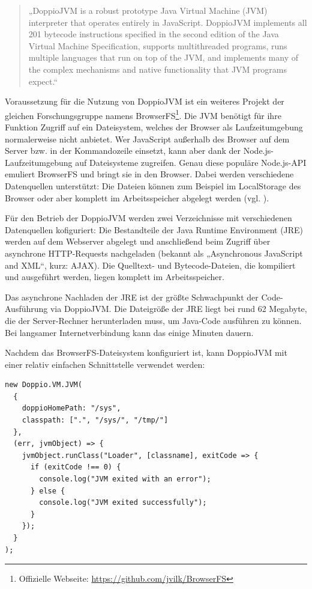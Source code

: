 \begin{quotation}
„DoppioJVM is a robust prototype Java Virtual Machine (JVM) interpreter
that operates entirely in JavaScript. DoppioJVM implements all 201 bytecode instructions specified in the second edition of the Java Virtual Machine Specification, supports multithreaded programs, runs multiple languages that run on top of the JVM, and implements many of the complex mechanisms and native functionality that JVM programs expect.“
\end{quotation}

Voraussetzung für die Nutzung von DoppioJVM ist ein weiteres Projekt der gleichen Forschungsgruppe namens BrowserFS\footnote{Offizielle Webseite: \url{https://github.com/jvilk/BrowserFS}}. Die JVM benötigt für ihre Funktion Zugriff auf ein Dateisystem, welches der Browser als Laufzeitumgebung normalerweise nicht anbietet. Wer JavaScript außerhalb des Browser auf dem Server bzw. in der Kommandozeile einsetzt, kann aber dank der Node.js-Laufzeitumgebung auf Dateisysteme zugreifen. Genau diese populäre Node.js-API emuliert BrowserFS und bringt sie in den Browser. Dabei werden verschiedene Datenquellen unterstützt: Die Dateien können zum Beispiel im LocalStorage des Browser oder aber komplett im Arbeitsspeicher abgelegt werden (vgl. \cite{web:browserfs_docs}).

Für den Betrieb der DoppioJVM werden zwei Verzeichnisse mit verschiedenen Datenquellen kofiguriert: Die Bestandteile der Java Runtime Environment (JRE) werden auf dem Webserver abgelegt und anschließend beim Zugriff über asynchrone HTTP-Requests nachgeladen (bekannt als „Asynchronous JavaScript and XML“, kurz: AJAX). Die Quelltext- und Bytecode-Dateien, die kompiliert und ausgeführt werden, liegen komplett im Arbeitsspeicher.

Das asynchrone Nachladen der JRE ist der größte Schwachpunkt der Code-Ausführung via DoppioJVM. Die Dateigröße der JRE liegt bei rund 62 Megabyte, die der Server-Rechner herunterladen muss, um Java-Code ausführen zu können. Bei langsamer Internetverbindung kann das einige Minuten dauern.

Nachdem das BrowserFS-Dateisystem konfiguriert ist, kann DoppioJVM mit einer relativ einfachen Schnittstelle verwendet werden:

\begin{minipage}{\linewidth}
\begin{lstlisting}[caption={Instanziierung der DoppioJVM (aus: src/server/actions/doppio.js)}]
new Doppio.VM.JVM(
  {
    doppioHomePath: "/sys",
    classpath: [".", "/sys/", "/tmp/"]
  },
  (err, jvmObject) => {
    jvmObject.runClass("Loader", [classname], exitCode => {
      if (exitCode !== 0) {
        console.log("JVM exited with an error");
      } else {
        console.log("JVM exited successfully");
      }
    });
  }
);
\end{lstlisting}
\end{minipage}

